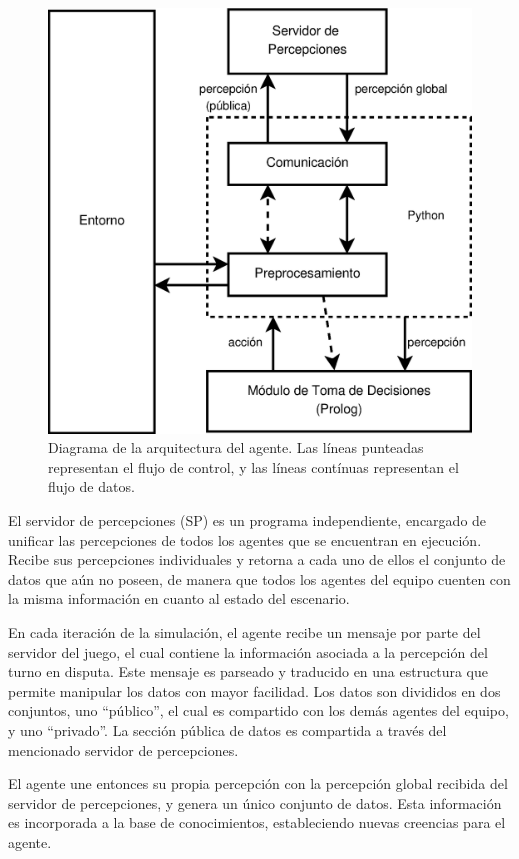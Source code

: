 \begin{figure}
\centering
\includegraphics[scale=.4]{graficos/eps/agent_architecture.eps}
\caption{Diagrama de la arquitectura del agente. Las líneas punteadas
representan el flujo de control, y las líneas contínuas representan el
flujo de datos.}
\label{fig:architecture}
\end{figure}

El servidor de percepciones (SP) es un programa independiente,
encargado de unificar las percepciones de todos los agentes que se
encuentran en ejecución.
Recibe sus percepciones individuales y retorna a cada uno de ellos el
conjunto de datos que aún no poseen, de manera que todos los agentes
del equipo cuenten con la misma información en cuanto al estado del
escenario.

En cada iteración de la simulación, el agente recibe un mensaje por
parte del servidor del juego, el cual contiene la información
asociada a la percepción del turno en disputa.
Este mensaje es parseado y traducido en una estructura que permite
manipular los datos con mayor facilidad.
Los datos son divididos en dos conjuntos, uno ``público'', el cual es
compartido con los demás agentes del equipo, y uno ``privado''.
La sección pública de datos es compartida a través del mencionado
servidor de percepciones.

El agente une entonces su propia percepción con la percepción global
recibida del servidor de percepciones, y genera un único conjunto de
datos.
Esta información es incorporada a la base de conocimientos,
estableciendo nuevas creencias para el agente.

